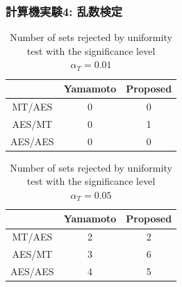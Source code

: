 \documentclass[dvipdfmx,11pt]{beamer}
\newcommand{\backupend}{
   \addtocounter{framenumberappendix}{-\value{framenumber}}
   \addtocounter{framenumber}{\value{framenumberappendix}} 
}
\begin{document}
\begin{frame}[c]\frametitle{計算機実験4: 乱数検定}
\begin{table}[t]
  \centering
  \caption{Number of sets rejected by uniformity test with the significance level $\alpha_T = 0.01$}
  \begin{tabular}{ccc} \hline
              & Yamamoto  & Proposed \\ \hline 
    MT/AES    & 0         & 0        \\
    AES/MT    & 0         & 1        \\
    AES/AES   & 0         & 0        \\ \hline 
  \end{tabular}
\end{table}
\begin{table}[t]
  \centering
  \caption{Number of sets rejected by uniformity test with the significance level $\alpha_T = 0.05$}
  \begin{tabular}{ccc} \hline
              & Yamamoto  & Proposed \\ \hline 
    MT/AES    & 2         & 2        \\
    AES/MT    & 3         & \alert{6}        \\
    AES/AES   & 4         & 5        \\ \hline 
  \end{tabular}
\end{table}
\end{frame}
\backupend
\end{document}
